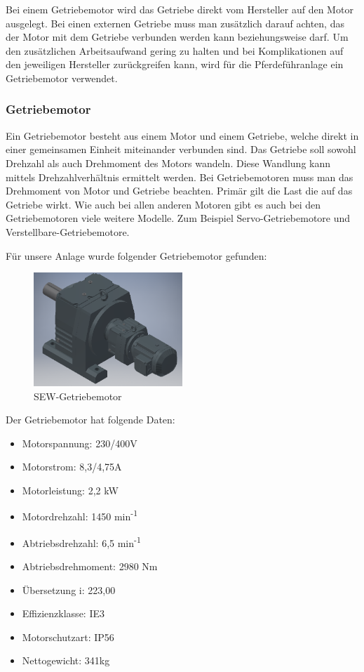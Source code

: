 Bei einem Getriebemotor wird das Getriebe direkt vom Hersteller auf den Motor ausgelegt. Bei einen externen Getriebe muss man zusätzlich darauf achten, das der Motor mit dem Getriebe verbunden werden kann beziehungsweise darf. Um den zusätzlichen Arbeitsaufwand gering zu halten und bei Komplikationen auf den jeweiligen Hersteller zurückgreifen kann, wird für die Pferdeführanlage ein Getriebemotor verwendet.

\subsubsection{Getriebemotor}
\label{sec:getriebemotor}

Ein Getriebemotor  besteht aus einem Motor und einem Getriebe, welche direkt in einer gemeinsamen Einheit miteinander verbunden sind. Das Getriebe soll sowohl Drehzahl als auch Drehmoment des Motors wandeln. Diese Wandlung kann mittels Drehzahlverhältnis ermittelt werden. Bei Getriebemotoren muss man das Drehmoment von Motor und Getriebe beachten. Primär gilt die Last die auf das Getriebe wirkt. 
Wie auch bei allen anderen Motoren gibt es auch bei den Getriebemotoren viele weitere Modelle. Zum Beispiel Servo-Getriebemotore und Verstellbare-Getriebemotore.

Für unsere Anlage wurde folgender Getriebemotor gefunden:

\begin{figure}[!ht]
\begin{center}
	\caption{SEW-Getriebemotor}
	\includegraphics[width=0.5\textwidth]{SEWGetriebemotor}
\end{center}
\end{figure}

Der Getriebemotor hat folgende Daten:

\begin{itemize}
	\item{Motorspannung: 230/400V}
	\item{Motorstrom: 8,3/4,75A}
	\item{Motorleistung: 2,2 kW}
	\item{Motordrehzahl: 1450 min\textsuperscript{-1}}
	\item{Abtriebsdrehzahl: 6,5 min\textsuperscript{-1}}
	\item{Abtriebsdrehmoment: 2980 Nm}
	\item{Übersetzung i: 223,00}
	\item{Effizienzklasse: IE3}
	\item{Motorschutzart: IP56}
	\item{Nettogewicht: 341kg}
\end{itemize}

